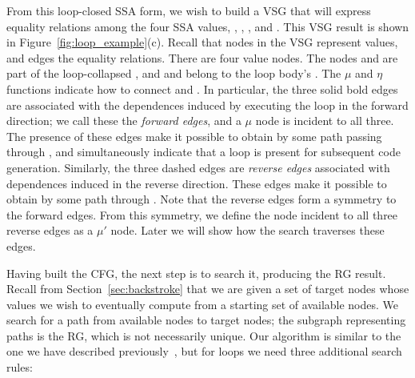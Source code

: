\documentclass[12pt]{gatech-thesis}
\begin{document}
From this loop-closed SSA form, we wish to build a VSG that will express equality relations among the four SSA values, \vinit, \vfinal, \vmu, and \viter.
This VSG result is shown in Figure~\ref{fig:loop_example}(c).
Recall that nodes in the VSG represent values, and edges the equality relations.
%
%
%
There are four value nodes.
The nodes \vinit and \vfinal are part of the loop-collapsed \pVSG, and \vmu and \viter belong to the loop body's \lVSG.
The $\mu$ and $\eta$ functions indicate how to connect \pVSG and \lVSG.
In particular, the three solid bold edges are associated with the dependences induced by executing the loop in the forward direction;
we call these the \emph{forward edges}, and a $\mu$ node is incident to all three.
The presence of these edges make it possible to obtain \vfinal by some path passing through \lVSG, and simultaneously indicate that a loop is present for subsequent code generation.
Similarly, the three dashed edges are \emph{reverse edges} associated with dependences induced in the reverse direction.
These edges make it possible to obtain \vinit by some path through \lVSG.
Note that the reverse edges form a symmetry to the forward edges.
From this symmetry, we define the node incident to all three reverse edges as a $\mu'$ node.
Later we will show how the search traverses these edges.

Having built the CFG, the next step is to search it, producing the RG result.
Recall from Section~\ref{sec:backstroke} that we are given a set of target nodes whose values we wish to eventually compute from a starting set of available nodes.
We search for a path from available nodes to target nodes; the subgraph representing paths is the RG, which is not necessarily unique.
Our algorithm is similar to the one we have described previously~\cite{Hou2012}, but for loops we need three additional search rules:
\end{document}
